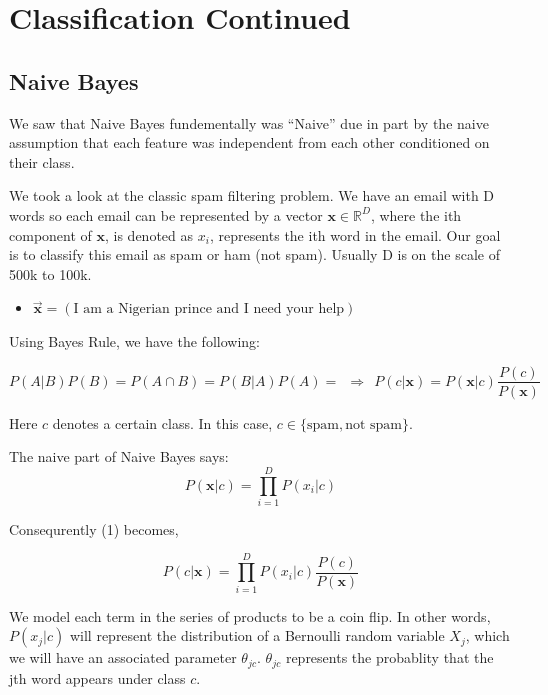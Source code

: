 
\section{Classification Continued}
\subsection{Naive Bayes}

We saw that Naive Bayes fundementally was ``Naive'' due in part by the naive assumption that each feature was independent from each other conditioned on their class.  

We took a look at the classic spam filtering problem.  We have an email with D words so each email can be represented by a vector $\mathbf{x} \in \mathbb{R}^D$, where the ith component of $\mathbf{x}$, is denoted as $x_i$, represents the ith word in the email.  Our goal is to classify this email as spam or ham (not spam).  Usually D is on the scale of 500k to 100k.  

\begin{itemize}
\item 
 $\vec{\mathbf{x}} = ( \text{I am a Nigerian prince and I need your help} ) $
\end{itemize}

Using Bayes Rule, we have the following: 

\begin{equation}
P(A | B ) P(B) = P(A \cap B) = P(B | A ) P(A) = ~~ \Rightarrow ~~ P(c | \mathbf{x}) = P(\mathbf{x} | c ) \frac{P(c)}{P(\mathbf{x})}
\end{equation}

Here $c$ denotes a certain class.  In this case, $c \in \{ \text{spam}, \text{not spam} \}$.   

\indent 

The naive part of Naive Bayes says: 
$$
P(\mathbf{x} | c ) = \prod_{i=1}^D P(x_i | c) 
$$

Consequrently (1) becomes, 

\begin{equation}
P(c | \mathbf{x}) = \prod_{i=1}^D P(x_i | c)  \frac{P(c)}{P(\mathbf{x})}
\end{equation}

We model each term in the series of products to be a coin flip.  In other words, $P(x_j | c)$ will represent the distribution of a Bernoulli random variable $X_j$, which we will have an associated parameter $\theta_{jc}$. $\theta_{jc}$ represents the probablity that the jth word appears under class $c$. 

